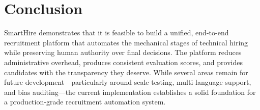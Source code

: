 \section{Conclusion}
\label{sec:final-conclusion}

SmartHire demonstrates that it is feasible to build a unified, end-to-end recruitment platform that automates the mechanical stages of technical hiring while preserving human authority over final decisions. The platform reduces administrative overhead, produces consistent evaluation scores, and provides candidates with the transparency they deserve. While several areas remain for future development---particularly around scale testing, multi-language support, and bias auditing---the current implementation establishes a solid foundation for a production-grade recruitment automation system.
